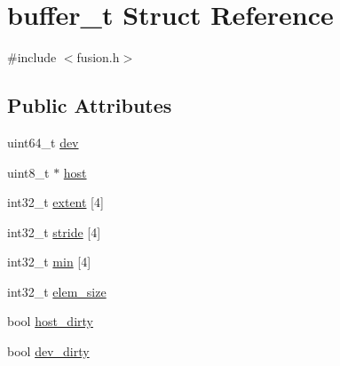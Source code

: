 \hypertarget{structbuffer__t}{\section{buffer\-\_\-t Struct Reference}
\label{structbuffer__t}
}


{\ttfamily \#include $<$fusion.\-h$>$}

\subsection*{Public Attributes}
\begin{DoxyCompactItemize}
\item 
uint64\-\_\-t \hyperlink{structbuffer__t_a6653bc34b20aa7c42bed9807d1111548}{dev}
\item 
uint8\-\_\-t $\ast$ \hyperlink{structbuffer__t_a48342b699f70a5399e892dfdfa271191}{host}
\item 
int32\-\_\-t \hyperlink{structbuffer__t_a8760bb291bb79576c6db5621edd2b4aa}{extent} \mbox{[}4\mbox{]}
\item 
int32\-\_\-t \hyperlink{structbuffer__t_a20a8d2dc77012a89ddfc2647ea15cb44}{stride} \mbox{[}4\mbox{]}
\item 
int32\-\_\-t \hyperlink{structbuffer__t_a1932b10069a734ee12e242b5b929e28a}{min} \mbox{[}4\mbox{]}
\item 
int32\-\_\-t \hyperlink{structbuffer__t_ae161a929ed7ed53425204ddcaf499c63}{elem\-\_\-size}
\item 
bool \hyperlink{structbuffer__t_a73a357ef44b1417a60ec0da43e9e0868}{host\-\_\-dirty}
\item 
bool \hyperlink{structbuffer__t_a6f8e9141729081246d3bfd1e6d1b376a}{dev\-\_\-dirty}
\end{DoxyCompactItemize}


